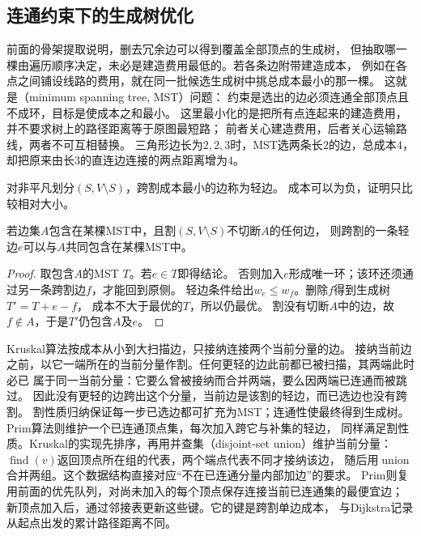\subsection{连通约束下的生成树优化}
\label{sec:graph-theory-minimum-spanning-tree}

前面的骨架提取说明，删去冗余边可以得到覆盖全部顶点的生成树，
但抽取哪一棵由遍历顺序决定，未必是建造费用最低的。若各条边附带建造成本，
例如在各点之间铺设线路的费用，就在同一批候选生成树中挑总成本最小的那一棵。
这就是（minimum spanning tree, MST）问题：
约束是选出的边必须连通全部顶点且不成环，目标是使成本之和最小。
这里最小化的是把所有点连起来的建造费用，并不要求树上的路径距离等于原图最短路；
前者关心建造费用，后者关心运输路线，两者不可互相替换。
三角形边长为\(2,2,3\)时，MST选两条长\(2\)的边，总成本\(4\)，
却把原来由长\(3\)的直连边连接的两点距离增为\(4\)。

对非平凡划分\((S,V\setminus S)\)，跨割成本最小的边称为轻边。
成本可以为负，证明只比较相对大小。

\begin{lemma}[最小生成树的割性质]
  \label{lem:graph-theory-mst-cut-property}
  若边集\(A\)包含在某棵MST中，且割\((S,V\setminus S)\)不切断\(A\)的任何边，
  则跨割的一条轻边\(e\)可以与\(A\)共同包含在某棵MST中。
\end{lemma}

\begin{proof}
取包含\(A\)的MST \(T\)。若\(e\in T\)即得结论。
否则加入\(e\)形成唯一环；该环还须通过另一条跨割边\(f\)，才能回到原侧。
轻边条件给出\(w_e\leq w_f\)。删除\(f\)得到生成树\(T'=T+e-f\)，
成本不大于最优的\(T\)，所以仍最优。
割没有切断\(A\)中的边，故\(f\notin A\)，于是\(T'\)仍包含\(A\)及\(e\)。
\end{proof}

Kruskal算法按成本从小到大扫描边，只接纳连接两个当前分量的边。
接纳当前边之前，以它一端所在的当前分量作割。任何更轻的边此前都已被扫描，其两端此时必已
属于同一当前分量：它要么曾被接纳而合并两端，要么因两端已连通而被跳过。
因此没有更轻的边跨出这个分量，当前边是该割的轻边，而已选边也没有跨割。
割性质归纳保证每一步已选边都可扩充为MST；连通性使最终得到生成树。
Prim算法则维护一个已连通顶点集，每次加入跨它与补集的轻边，
同样满足割性质。Kruskal的实现先排序，再用并查集（disjoint-set union）维护当前分量：
\(\operatorname{find}(v)\)返回顶点所在组的代表，两个端点代表不同才接纳该边，
随后用\(\operatorname{union}\)合并两组。这个数据结构直接对应“不在已连通分量内部加边”的要求。
Prim则复用前面的优先队列，对尚未加入的每个顶点保存连接当前已连通集的最便宜边；
新顶点加入后，通过邻接表更新这些键。它的键是跨割单边成本，
与Dijkstra记录从起点出发的累计路径距离不同。

